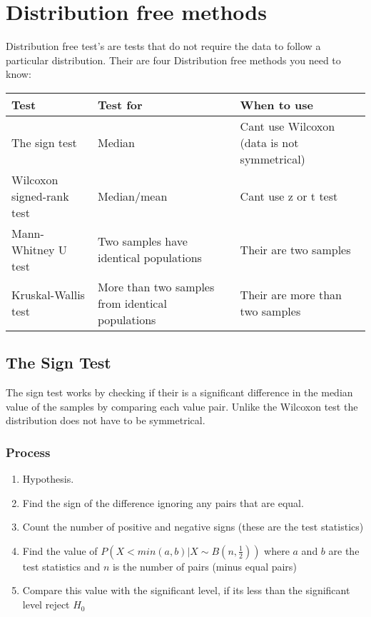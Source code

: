 \newpage
\section{Distribution free methods}
    Distribution free test's are tests that do not require the data to follow a particular distribution. Their are four Distribution free methods you need to know:

    \begin{center}
    \begin{tabulary}{\linewidth}{|L|L|L|}
    \hline
    Test & Test for & When to use \\\hline
    The sign test & Median & Cant use Wilcoxon (data is not symmetrical) \\\hline
    Wilcoxon signed-rank test & Median/mean & Cant use z or t test \\\hline
    Mann-Whitney U test & Two samples have identical populations & Their are two samples \\\hline
    Kruskal-Wallis test & More than two samples from identical populations & Their are more than two samples \\\hline
    \end{tabulary}
    \end{center}

    \newpage
    \subsection{The Sign Test}
        
        The sign test works by checking if their is a significant difference in the median value of the samples by comparing each value pair. Unlike the Wilcoxon test the distribution does not have to be symmetrical.
        
        \subsubsection{Process}
            \begin{enumerate}
            \item Hypothesis.
            \item Find the sign of the difference ignoring any pairs that are equal.
            \item Count the number of positive and negative signs (these are the test statistics)
            \item Find the value of $P(X < min(a, b) | X \sim B(n, \frac{1}{2}))$ where $a$ and $b$ are the test statistics and $n$ is the number of pairs (minus equal pairs)
            \item Compare this value with the significant level, if its less than the significant level reject $H_0$
            \end{enumerate}
        
